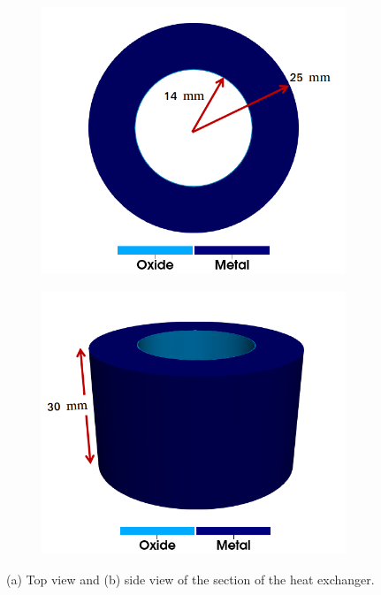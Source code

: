 \begin{figure}
  \centering
  \begin{subfigure}{0.4\textwidth}
    \centering
    \includegraphics[width=\textwidth]{Chapter5/figures/spallation/top_view}
    \caption{}
  \end{subfigure}
  \begin{subfigure}{0.4\textwidth}
    \centering
    \includegraphics[width=\textwidth]{Chapter5/figures/spallation/side_view}
    \caption{}
  \end{subfigure}
  \caption[Schematics of the heat exchanger.]{(a) Top view and (b) side view of the section of the heat exchanger.}
  \label{fig: Chapter5/spallation/schematics}
\end{figure}
